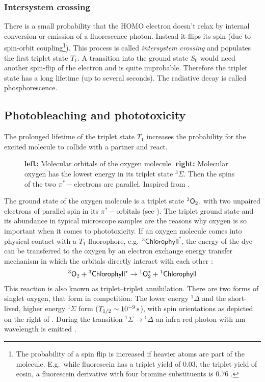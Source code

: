 \subsubsection{Intersystem crossing}
There is a small probability that the HOMO electron doesn't relax by
internal conversion or emission of a fluorescence photon. Instead it
flips its spin (due to spin-orbit coupling\footnote{The probability of
  a spin flip is increased if heavier atoms are part of the
  molecule. E.g.\ while fluorescein has a triplet yield of 0.03, the
  triplet yield of eosin, a fluorescein derivative with four bromine
  substituents is 0.76 \citep[p.~37]{Sauer2011}.}). This process is
called \emph{intersystem crossing} and populates the first triplet
state $T_1$. A transition into the ground state $S_0$ would need
another spin-flip of the electron and is quite improbable. Therefore
the triplet state has a long lifetime (up to several seconds). The
radiative decay is called phosphorescence.
  

\subsection{Photobleaching and phototoxicity}
The prolonged lifetime of the triplet state $T_1$ increases the
probability for the excited molecule to collide with a partner and
react.

\begin{figure}[!hbt]
  \centering
  
  \caption{{\bf left:} Molecular orbitals of the oxygen molecule. {\bf
      right:} Molecular oxygen has the lowest energy in its triplet
    state ${}^3\Sigma$. Then the spins of the two $\pi^*-$electrons
    are parallel. Inspired from \citet{Linde2011a}.}
  \label{fig:oxygen}
\end{figure}


The ground state of the oxygen molecule is a triplet state ${}^3\textsf{O}_2$,
with two unpaired electrons of parallel spin in its $\pi^*-$orbitals
(see ). The triplet ground state and its abundance
in typical microscope samples are the reasons why oxygen is so
important when it comes to phototoxicity. If an oxygen molecule comes
into physical contact with a $T_1$ fluorophore, e.g.\
${}^3\textsf{Chlorophyll}^*$, the energy of the dye can be transferred
to the oxygen by an electron exchange energy transfer mechanism in
which the orbitals directly interact with each other
\citetext{\citealp[p.~438]{Haken2006} and \citealp{Linde2011a}}:
\begin{align}
  {}^3\textsf{O}_2 + {}^3\textsf{Chlorophyll}^* \rightarrow
  {}^1\textsf{O}^*_2+{}^1\textsf{Chlorophyll}
\end{align}
This reaction is also known as triplet--triplet annihilation.  There
are two forms of singlet oxygen, that form in competition: The lower
energy ${}^1\Delta$ and the short-lived, higher energy ${}^1\Sigma$
form ($T_{1/2}\sim\unit[10^{-9}]{s}$), with spin orientations as
depicted on the right of \figref{fig:oxygen}. During the transition
${}^1\Sigma\rightarrow{}^1\Delta$ an infra-red photon with
\unit[1268]{nm} wavelength is emitted \citep[p.~20]{Linde2011a}.

